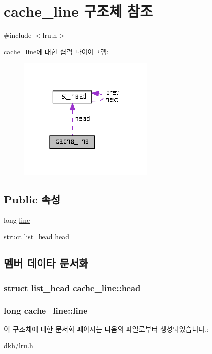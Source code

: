 \hypertarget{structcache__line}{\section{cache\+\_\+line 구조체 참조}
\label{structcache__line}
}


{\ttfamily \#include $<$lru.\+h$>$}



cache\+\_\+line에 대한 협력 다이어그램\+:
\nopagebreak
\begin{figure}[H]
\begin{center}
\leavevmode
\includegraphics[width=187pt]{structcache__line__coll__graph}
\end{center}
\end{figure}
\subsection*{Public 속성}
\begin{DoxyCompactItemize}
\item 
long \hyperlink{structcache__line_a22870a00436e7425597606393d81eb2c}{line}
\item 
struct \hyperlink{structlist__head}{list\+\_\+head} \hyperlink{structcache__line_af231d538713478b74fc7811adc00545b}{head}
\end{DoxyCompactItemize}


\subsection{멤버 데이타 문서화}
\hypertarget{structcache__line_af231d538713478b74fc7811adc00545b}{
\subsubsection[{head}]{\setlength{\rightskip}{0pt plus 5cm}struct {\bf list\+\_\+head} cache\+\_\+line\+::head}}\label{structcache__line_af231d538713478b74fc7811adc00545b}
\hypertarget{structcache__line_a22870a00436e7425597606393d81eb2c}{
\subsubsection[{line}]{\setlength{\rightskip}{0pt plus 5cm}long cache\+\_\+line\+::line}}\label{structcache__line_a22870a00436e7425597606393d81eb2c}


이 구조체에 대한 문서화 페이지는 다음의 파일로부터 생성되었습니다.\+:\begin{DoxyCompactItemize}
\item 
dkh/\hyperlink{lru_8h}{lru.\+h}\end{DoxyCompactItemize}
